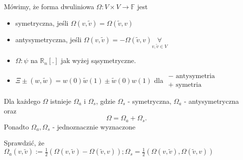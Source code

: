\documentclass[../main.tex]{subfiles}
\begin{document}
    \begin{definicja}
        Mówimy, że forma dwuliniowa $\Omega: V \times V\to \mathbb{F}$ jest
        \begin{itemize}
            \item symetryczna, jeśli $\Omega(v,\tilde v) = \Omega(\tilde v, v)$
            \item antysymetryczna, jeśli $\Omega(v,\tilde v) = - \Omega(\tilde v, v) \underset{v,\tilde v\in V}{\forall} $
        \end{itemize}
    \end{definicja}
    \begin{przyklad}
        \begin{itemize}
            \item $\Omega: \psi$ na $\mathbb{R}_n [.]$ jak wyżej sąsymetryczne.
            \item $\Xi\pm (w,\tilde w) = w(0)\tilde w(1) \pm \tilde w(0) w(1)$ dla $\begin{matrix}- \text{ antysymetria}\\ + \text{ symetria}\end{matrix}$
        \end{itemize}
    \end{przyklad}

    \begin{stw}
        Dla każdego $\Omega$ istnieje  $\Omega_a$ i $\Omega_s$, gdzie $\Omega_s$ - symetryczna, $\Omega_a$ - antysymetryczna oraz
        \[
        \Omega = \Omega_a + \Omega_s
        .\] Ponadto $\Omega_a, \Omega_s$ - jednoznacznie wyznaczone
    \end{stw}
    \begin{dowod}
        Sprawdzić, że $\Omega_a(v,\tilde v) := \frac{1}{2}(\Omega(v,\tilde v) - \Omega (\tilde v,v)); \Omega_s = \frac{1}{2}(\Omega(v,\tilde v),\Omega(\tilde v, v))$
    \end{dowod}
\end{document}
